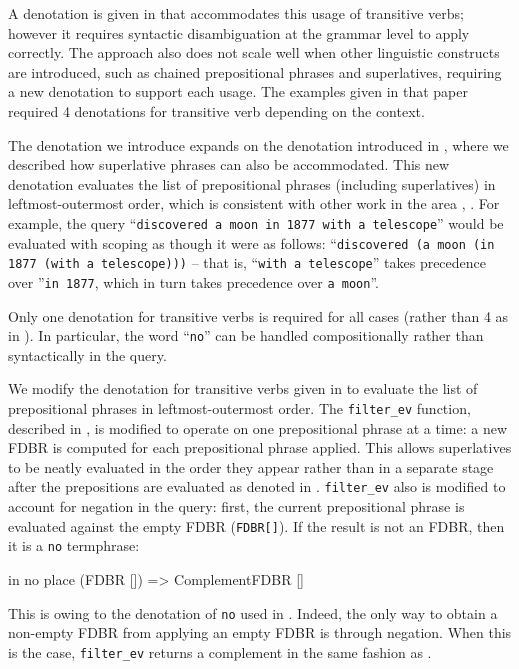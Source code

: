 \documentclass[../main.tex]{subfiles}
\begin{document}
\begin{refsection}
A denotation is given in \cite{frostboulos2002} that accommodates this usage of transitive verbs; however it requires syntactic disambiguation at the grammar level to apply correctly.  The approach also does not scale well when other linguistic constructs are introduced, such as chained prepositional phrases and superlatives, requiring a new denotation to support each usage.  The examples given in that paper required 4 denotations for transitive verb depending on the context.

The denotation we introduce expands on the denotation introduced in \cite{frostpeelar2019}, where we described how superlative phrases can also be accommodated.  This new denotation evaluates the list of prepositional phrases (including superlatives) in leftmost-outermost order, which is consistent with other work in the area \cite{champollion2010quantification}, \cite{ferre2014squall}.  For example, the query ``\texttt{discovered a moon in 1877 with a telescope}'' would be evaluated with scoping as though it were as follows:
``\texttt{discovered (a moon (in 1877 (with a telescope)))} -- that is, ``\texttt{with a telescope}'' takes precedence over ''\texttt{in 1877}, which in turn takes precedence over \texttt{a moon}''.

Only one denotation for transitive verbs is required for all cases (rather than 4 as in \cite{frostboulos2002}). In particular, the word ``\texttt{no}'' can be handled compositionally rather than syntactically in the query.

We modify the denotation for transitive verbs given in \cite{peelar2020webistjournal} to evaluate the list of prepositional phrases in leftmost-outermost order.  The \texttt{filter\_ev} function, described in \cite{peelar2016accommodating}, is modified to operate on one prepositional phrase at a time: a new FDBR is computed for each prepositional phrase applied.  This allows superlatives to be neatly evaluated in the order they appear rather than in a separate stage after the prepositions are evaluated as denoted in \cite{frostpeelar2019}.  \texttt{filter\_ev} also is modified to account for negation in the query: first, the current prepositional phrase is evaluated against the empty FDBR (\texttt{FDBR[]}).  If the result is not an FDBR, then it is a \texttt{no} termphrase:
\begin{code}
    in no place (FDBR []) => ComplementFDBR []
\end{code}
This is owing to the denotation of \texttt{no} used in .  Indeed, the only way to obtain a non-empty FDBR from applying an empty FDBR is through negation.  When this is the case, \texttt{filter\_ev} returns a complement in the same fashion as \cite{frostboulos2002}.


\end{refsection}
\end{document}
